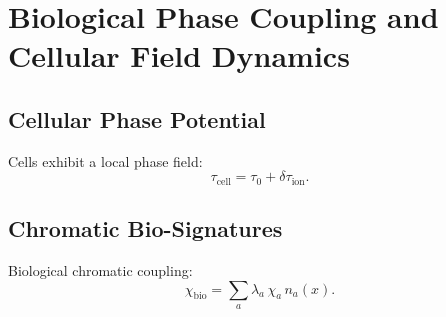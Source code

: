 \chapter{Biological Phase Coupling and Cellular Field Dynamics}

\section{Cellular Phase Potential}
Cells exhibit a local phase field:
\[
\tau_{\mathrm{cell}} = \tau_0 + \delta\tau_{\mathrm{ion}}.
\]

\section{Chromatic Bio-Signatures}
Biological chromatic coupling:
\[
\chi_{\mathrm{bio}} = \sum_a \lambda_a\, \chi_a\, n_a(x).
\]

